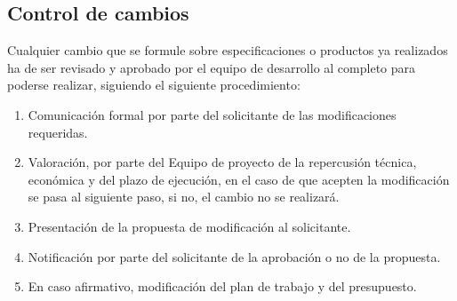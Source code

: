 \subsection{Control de cambios}

Cualquier cambio que se formule sobre especificaciones o productos ya realizados ha de ser revisado y aprobado por el equipo de desarrollo al completo para poderse realizar, siguiendo el siguiente procedimiento:

\begin{enumerate}
	\item Comunicación formal por parte del solicitante de las modificaciones requeridas.
	\item Valoración, por parte del Equipo de proyecto de la repercusión técnica, económica y del plazo de ejecución, en el caso de que acepten la modificación se pasa al siguiente paso, si no, el cambio no se realizará.
	\item Presentación de la propuesta de modificación al solicitante.
	\item Notificación por parte del solicitante de la aprobación o no de la propuesta.
	\item En caso afirmativo, modificación del plan de trabajo y del presupuesto.
\end{enumerate}
